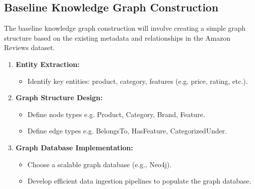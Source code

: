 \documentclass{article}
\begin{document}
\subsection{Baseline Knowledge Graph Construction}
The baseline knowledge graph construction will involve creating a simple graph structure based on the existing metadata and relationships in the Amazon Reviews dataset.
\begin{enumerate}
    \item \textbf{Entity Extraction:}
    \begin{itemize}
        \item Identify key entities: product, category, features (e.g. price, rating, etc.). 
    \end{itemize}
    
    \item \textbf{Graph Structure Design:}
    \begin{itemize}
        \item Define node types e.g. Product, Category, Brand, Feature.
        \item Define edge types e.g. BelongsTo, HasFeature, CategorizedUnder.
    \end{itemize}
    
    \item \textbf{Graph Database Implementation:}
    \begin{itemize}
        \item Choose a scalable graph database (e.g., Neo4j).
        \item Develop efficient data ingestion pipelines to populate the graph database.
    \end{itemize}
\end{enumerate}
\end{document}
